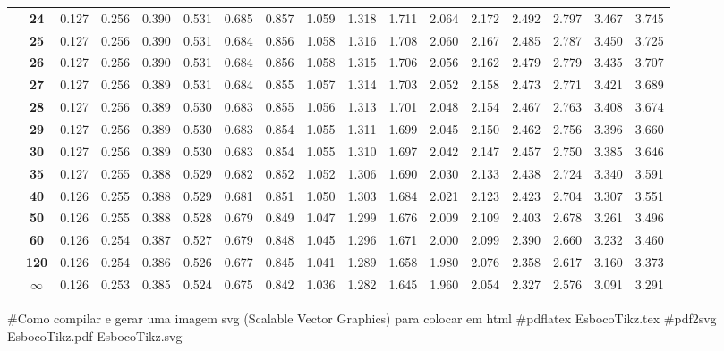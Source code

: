 {\begin{tabular}{cc|ccccccccccccccc}
    & \textbf{24} & 0.127 & 0.256 & 0.390 & 0.531 & 0.685 & 0.857 & 1.059 & 1.318 & 1.711 & 2.064 & 2.172 & 2.492 & 2.797 & 3.467 & 3.745 \\
    & \textbf{25} & 0.127 & 0.256 & 0.390 & 0.531 & 0.684 & 0.856 & 1.058 & 1.316 & 1.708 & 2.060 & 2.167 & 2.485 & 2.787 & 3.450 & 3.725 \\
    & \textbf{26} & 0.127 & 0.256 & 0.390 & 0.531 & 0.684 & 0.856 & 1.058 & 1.315 & 1.706 & 2.056 & 2.162 & 2.479 & 2.779 & 3.435 & 3.707 \\
    & \textbf{27} & 0.127 & 0.256 & 0.389 & 0.531 & 0.684 & 0.855 & 1.057 & 1.314 & 1.703 & 2.052 & 2.158 & 2.473 & 2.771 & 3.421 & 3.689 \\
    & \textbf{28} & 0.127 & 0.256 & 0.389 & 0.530 & 0.683 & 0.855 & 1.056 & 1.313 & 1.701 & 2.048 & 2.154 & 2.467 & 2.763 & 3.408 & 3.674 \\
    & \textbf{29} & 0.127 & 0.256 & 0.389 & 0.530 & 0.683 & 0.854 & 1.055 & 1.311 & 1.699 & 2.045 & 2.150 & 2.462 & 2.756 & 3.396 & 3.660 \\
    & \textbf{30} & 0.127 & 0.256 & 0.389 & 0.530 & 0.683 & 0.854 & 1.055 & 1.310 & 1.697 & 2.042 & 2.147 & 2.457 & 2.750 & 3.385 & 3.646 \\
    & \textbf{35} & 0.127 & 0.255 & 0.388 & 0.529 & 0.682 & 0.852 & 1.052 & 1.306 & 1.690 & 2.030 & 2.133 & 2.438 & 2.724 & 3.340 & 3.591 \\
    & \textbf{40} & 0.126 & 0.255 & 0.388 & 0.529 & 0.681 & 0.851 & 1.050 & 1.303 & 1.684 & 2.021 & 2.123 & 2.423 & 2.704 & 3.307 & 3.551 \\
    & \textbf{50} & 0.126 & 0.255 & 0.388 & 0.528 & 0.679 & 0.849 & 1.047 & 1.299 & 1.676 & 2.009 & 2.109 & 2.403 & 2.678 & 3.261 & 3.496 \\
    & \textbf{60} & 0.126 & 0.254 & 0.387 & 0.527 & 0.679 & 0.848 & 1.045 & 1.296 & 1.671 & 2.000 & 2.099 & 2.390 & 2.660 & 3.232 & 3.460 \\
    & \textbf{120} & 0.126 & 0.254 & 0.386 & 0.526 & 0.677 & 0.845 & 1.041 & 1.289 & 1.658 & 1.980 & 2.076 & 2.358 & 2.617 & 3.160 & 3.373 \\
    & \textbf{\(\infty\)} & 0.126 & 0.253 & 0.385 & 0.524 & 0.675 & 0.842 & 1.036 & 1.282 & 1.645 & 1.960 & 2.054 & 2.327 & 2.576 & 3.091 & 3.291 \\
    \hline
\end{tabular}
}



#Como compilar e gerar uma imagem svg (Scalable Vector Graphics) para colocar em html
#pdflatex EsbocoTikz.tex
#pdf2svg EsbocoTikz.pdf EsbocoTikz.svg
